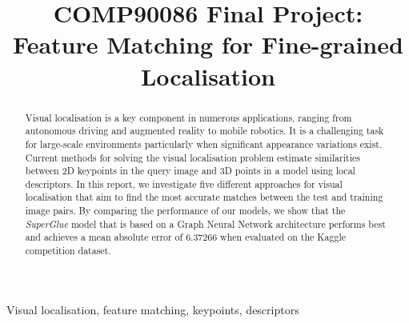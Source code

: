 \documentclass[conference]{IEEEtran}
\begin{document}
\title{COMP90086 Final Project:\\ Feature Matching for Fine-grained Localisation\\}

\author{
\and
{}
}

\maketitle

\begin{abstract}
Visual localisation is a key component in numerous applications, ranging from autonomous
driving and augmented reality to mobile robotics. It is a challenging task for large-scale
environments particularly when significant appearance
variations exist. Current methods for solving the visual localisation problem estimate similarities between 2D keypoints in the query image and 3D points in a model using local descriptors. In this report, we investigate five different approaches for visual localisation that aim to find the most accurate matches between the test and training image pairs. By comparing the performance of our models, we show that the \textit{SuperGlue} model that is based on a Graph Neural Network architecture performs best and achieves a mean absolute error of $6.37266$ when evaluated on the Kaggle competition dataset.
\end{abstract}

\begin{IEEEkeywords}
Visual localisation, feature matching, keypoints, descriptors
\end{IEEEkeywords}
\end{document}
